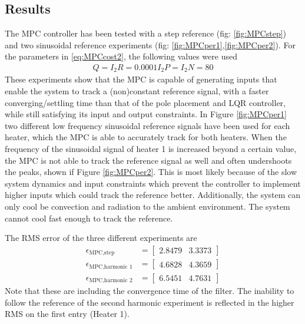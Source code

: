 \subsection{Results}\label{sec:MPC_Results}
The MPC controller has been tested with a step reference (fig: \ref{fig:MPCstep}) and two sinusoidal reference experiments (fig: \ref{fig:MPCper1},\ref{fig:MPCper2}). For the parameters in \ref{eq:MPCcost2}, the following values were used
\begin{align*}
    Q = I_2
    R = 0.0001I_2
    P = I_2
    N = 80
\end{align*}
These experiments show that the MPC is capable of generating inputs that enable the system to track a (non)constant reference signal, with a faster converging/settling time than that of the pole placement and LQR controller, while still satisfying its input and output constraints. In Figure \ref{fig:MPCper1} two different low frequency sinusoidal reference signals have been used for each heater, which the MPC is able to accurately track for both heaters. When the frequency of the sinusoidal signal of heater 1 is increased beyond a certain value, the MPC is not able to track the reference signal as well and often undershoots the peaks, shown if Figure \ref{fig:MPCper2}. This is most likely because of the slow system dynamics and input constraints which prevent the controller to implement higher inputs which could track the reference better. Additionally, the system can only cool be convection and radiation to the ambient environment. The system cannot cool fast enough to track the reference.

The RMS error of the three different experiments are
\begin{align*}
    \epsilon_{\text{MPC,step}} &= \begin{bmatrix} 2.8479 & 3.3373\end{bmatrix}\\
    \epsilon_{\text{MPC,harmonic 1}} &= \begin{bmatrix} 4.6828 & 4.3659 \end{bmatrix}\\
    \epsilon_{\text{MPC,harmonic 2}} &= \begin{bmatrix} 6.5451 & 4.7631\end{bmatrix}
\end{align*}
Note that these are including the convergence time of the filter. The inability to follow the reference of the second harmonic experiment is reflected in the higher RMS on the first entry (Heater 1).

